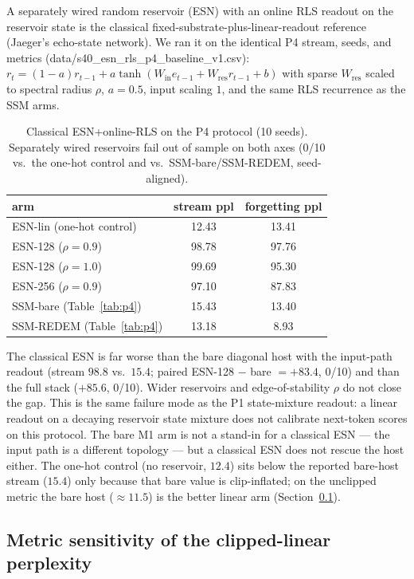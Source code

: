 \documentclass[preprint,12pt]{elsarticle}
\begin{document}
A separately wired random reservoir (ESN) with an online RLS readout on
the reservoir state is the classical fixed-substrate-plus-linear-readout
reference (Jaeger's echo-state network). We ran it on the identical P4
stream, seeds, and metrics (data/s40\_esn\_rls\_p4\_baseline\_v1.csv):
$r_t=(1-a)r_{t-1}+a\tanh(W_{\mathrm{in}}e_{t-1}+W_{\mathrm{res}}r_{t-1}+b)$
with sparse $W_{\mathrm{res}}$ scaled to spectral radius $\rho$, $a=0.5$,
input scaling $1$, and the same RLS recurrence as the SSM arms.

\begin{table}[t]
\centering
\small
\begin{tabular}{lcc}
\toprule
arm & stream ppl & forgetting ppl \\
\midrule
ESN-lin (one-hot control) & 12.43 & 13.41 \\
ESN-128 ($\rho=0.9$) & 98.78 & 97.76 \\
ESN-128 ($\rho=1.0$) & 99.69 & 95.30 \\
ESN-256 ($\rho=0.9$) & 97.10 & 87.83 \\
SSM-bare (Table~\ref{tab:p4}) & 15.43 & 13.40 \\
SSM-REDEM (Table~\ref{tab:p4}) & 13.18 & 8.93 \\
\bottomrule
\end{tabular}
\caption{Classical ESN+online-RLS on the P4 protocol (10 seeds).
Separately wired reservoirs fail out of sample on both axes (0/10 vs.\
the one-hot control and vs.\ SSM-bare/SSM-REDEM, seed-aligned).}
\label{tab:esn}
\end{table}

The classical ESN is far worse than the bare diagonal host with the
input-path readout (stream $98.8$ vs.\ $15.4$; paired
ESN-128 $-$ bare $=+83.4$, 0/10) and than the full stack
($+85.6$, 0/10). Wider reservoirs and edge-of-stability $\rho$ do not
close the gap. This is the same failure mode as the P1 state-mixture
readout: a linear readout on a decaying reservoir state mixture does not
calibrate next-token scores on this protocol. The bare M1 arm is not a
stand-in for a classical ESN --- the input path is a different topology
--- but a classical ESN does not rescue the host either. The one-hot
control (no reservoir, $12.4$) sits below the reported bare-host stream
($15.4$) only because that bare value is clip-inflated; on the unclipped
metric the bare host ($\approx 11.5$) is the better linear arm
(Section~\ref{sec:sens}).

\subsection{Metric sensitivity of the clipped-linear perplexity}
\label{sec:sens}
\end{document}

